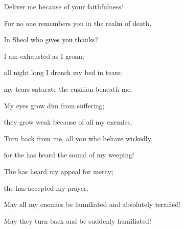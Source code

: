 {\par }{\Q Deliver
me because
of your faithfulness!
\par }{\Q {}For
no
one remembers you in the realm
of death,

\par }{\Q In Sheol
who
gives you thanks?
\par }{\Q {}I am exhausted
as I groan;
\par }{\Q all
night
long I drench
my bed
in tears;

\par }{\Q my tears
saturate
the cushion
beneath me.
\par }{\Q {}My eyes
grow dim
from suffering;
\par }{\Q they grow
weak because of all
my enemies.
\par }{\Q {}Turn
back from me,
all
you who behave
wickedly,
\par }{\Q for
the {}
has heard
the sound
of my weeping!
\par }{\Q {}The
{}
has heard
my appeal for mercy;
\par }{\Q the {}
has accepted
my prayer.
\par }{\Q {}May all
my enemies
be humiliated
and absolutely terrified!

\par }{\Q May they turn back
and be suddenly
humiliated!


\par }
